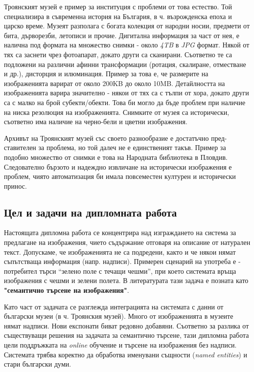 \documentclass[a4paper,12pt]{article}
\begin{document}
\bigbreak

Троянският музей е пример за институция с проблеми от това естество. Той специализира в съвременна история на България, в ч. възрожденска епоха и царско време. Музеят разполага с богата колекция от народни носии, предмети от бита, дърворезби, летописи и прочие. Дигитална информация за част от нея, е налична под формата на множество снимки - около \textit{4TB} в \textit{JPG} формат. Някой от тях са заснети чрез фотоапарат, докато други са сканирани. Съответно те са подложени на различни афинни трансформации (ротация, скалиране, отместване и др.), дисторция и илюминация. Пример за това е, че размерите на изображенията варират от около 200KB до около 10MB. Детайлността на изображенията варира значително - някои от тях са с тълпи от хора, докато други са с малко на брой субекти/обекти. Това би могло да
бъде проблем при наличие на ниска резолюция на изображенията. Снимките от музея са исторически, съответно има наличие на черно-бели и цветни
изображения.

\bigbreak

Архивът на Троянският музей със своето разнообразие е достатъчно пред-
ставителен за проблема, но той далеч не е единственият такъв. Пример за
подобно множество от снимки е това на Народната библиотека в Пловдив.
Следователно бързото и надеждно извличане на исторически изображения е проблем, чиято автоматизация би имала повсеместен културен и исторически принос.

\subsection{Цел и задачи на дипломната работа}

Настоящата дипломна работа се концентрира над изграждането на система за предлагане на изображения, чието съдържание отговаря на описание от натурален текст. Допускаме, че изображенията не са подредени, както и че някои нямат съпътстваща информация (напр. надписи). Примерен сценарий на употреба е - потребител търси “зелено поле с течащи чешми”, при което системата връща изображения с чешми и зелени полета. В литературата тази задача е позната като \textbf{"семантично търсене на изображения"}.

\bigbreak

Като част от задачата се разглежда интеграцията на системата с данни от български музеи (в ч. Троянския музей). Много от изображенията в музеите нямат надписи. Нови експонати биват редовно добавяни. Съответно за разлика от съществуващи решения на задачата за семантично търсене, тази дипломна работа цели поддръжката на \textit{online} обучение и търсене на изображения без надписи. Системата трябва коректно да обработва именувани същности (\textit{named entities}) и стари български думи.
\end{document}
